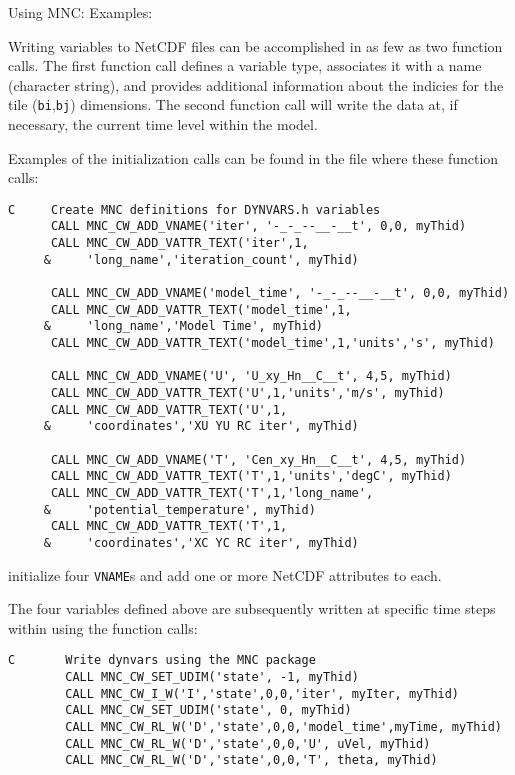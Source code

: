 Using MNC: Examples:

Writing variables to NetCDF files can be accomplished in as few as two
function calls.  The first function call defines a variable type,
associates it with a name (character string), and provides additional
information about the indicies for the tile (\texttt{bi},\texttt{bj})
dimensions.  The second function call will write the data at, if
necessary, the current time level within the model.

Examples of the initialization calls can be found in the file 
where these function calls:
{\footnotesize
\begin{verbatim}
C     Create MNC definitions for DYNVARS.h variables
      CALL MNC_CW_ADD_VNAME('iter', '-_-_--__-__t', 0,0, myThid)
      CALL MNC_CW_ADD_VATTR_TEXT('iter',1,
     &     'long_name','iteration_count', myThid)

      CALL MNC_CW_ADD_VNAME('model_time', '-_-_--__-__t', 0,0, myThid)
      CALL MNC_CW_ADD_VATTR_TEXT('model_time',1,
     &     'long_name','Model Time', myThid)
      CALL MNC_CW_ADD_VATTR_TEXT('model_time',1,'units','s', myThid)

      CALL MNC_CW_ADD_VNAME('U', 'U_xy_Hn__C__t', 4,5, myThid)
      CALL MNC_CW_ADD_VATTR_TEXT('U',1,'units','m/s', myThid)
      CALL MNC_CW_ADD_VATTR_TEXT('U',1,
     &     'coordinates','XU YU RC iter', myThid)

      CALL MNC_CW_ADD_VNAME('T', 'Cen_xy_Hn__C__t', 4,5, myThid)
      CALL MNC_CW_ADD_VATTR_TEXT('T',1,'units','degC', myThid)
      CALL MNC_CW_ADD_VATTR_TEXT('T',1,'long_name',
     &     'potential_temperature', myThid)
      CALL MNC_CW_ADD_VATTR_TEXT('T',1,
     &     'coordinates','XC YC RC iter', myThid)
\end{verbatim}
}
{\noindent initialize four \texttt{VNAME}s and add one or more NetCDF
  attributes to each.}
    
The four variables defined above are subsequently written at specific
time steps within
using the function calls:
{\footnotesize
\begin{verbatim}
C       Write dynvars using the MNC package
        CALL MNC_CW_SET_UDIM('state', -1, myThid)
        CALL MNC_CW_I_W('I','state',0,0,'iter', myIter, myThid)
        CALL MNC_CW_SET_UDIM('state', 0, myThid)
        CALL MNC_CW_RL_W('D','state',0,0,'model_time',myTime, myThid)
        CALL MNC_CW_RL_W('D','state',0,0,'U', uVel, myThid)
        CALL MNC_CW_RL_W('D','state',0,0,'T', theta, myThid)
\end{verbatim}
}

